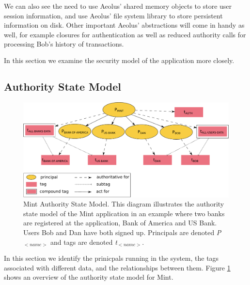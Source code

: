 We can also see the need to use Aeolus' shared memory objects to store user session information, and use Aeolus' file system library to store persistent information on disk. Other important Aeolus' abstractions will come in handy as well, for example closures for authentication as well as reduced authority calls for processing Bob's history of transactions.

In this section we examine the security model of the application more closely.

\subsection{Authority State Model}

\begin{figure}[h]
\centering
\includegraphics[width=\textwidth,height=\textheight,keepaspectratio]{figures/mint-auth-state-model}
\caption[Mint Authority State Model]{Mint Authority State Model. This diagram illustrates the authority state model of the Mint application in an example where two banks are registered at the application, Bank of America and US Bank. Users Bob and Dan have both signed up. Principals are denoted \emph{P$_{<name>}$} and tags are denoted \emph{t$_{<name>}$}.}
\label{fig:mint-auth-state-model}
\end{figure}


In this section we identify the prinicpals running in the system, the tags associated with different data, and the relationships between them. Figure \ref{fig:mint-auth-state-model} shows an overview of the authority state model for Mint.

